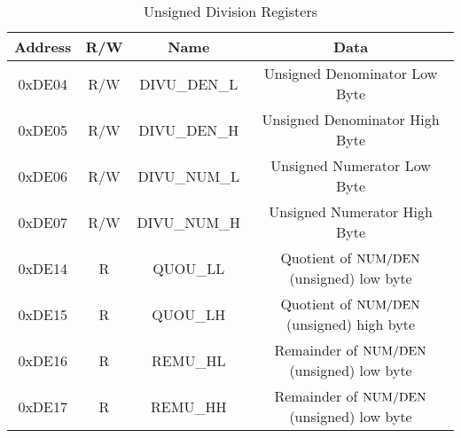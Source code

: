 \begin{table}[ht]
    \begin{center}
        \begin{tabular}{|c|c|c|c|} \hline
            Address & R/W & Name & Data \\\hline\hline
            0xDE04  & R/W & DIVU\_DEN\_L & Unsigned Denominator Low Byte \\\hline
            0xDE05  & R/W & DIVU\_DEN\_H & Unsigned Denominator High Byte \\\hline
            0xDE06  & R/W & DIVU\_NUM\_L & Unsigned Numerator Low Byte \\\hline
            0xDE07  & R/W & DIVU\_NUM\_H & Unsigned Numerator High Byte \\\hline
            0xDE14  & R   & QUOU\_LL   & Quotient of ${\rm NUM} / {\rm DEN}$ (unsigned) low byte \\\hline
            0xDE15  & R   & QUOU\_LH   & Quotient of ${\rm NUM} / {\rm DEN}$ (unsigned) high byte \\\hline
            0xDE16  & R   & REMU\_HL   & Remainder of ${\rm NUM} / {\rm DEN}$ (unsigned) low byte \\\hline
            0xDE17  & R   & REMU\_HH   & Remainder of ${\rm NUM} / {\rm DEN}$ (unsigned) low byte \\\hline  
        \end{tabular}
    \end{center}
    \caption{Unsigned Division Registers}
    \label{tab:math_div_reg}
\end{table}

